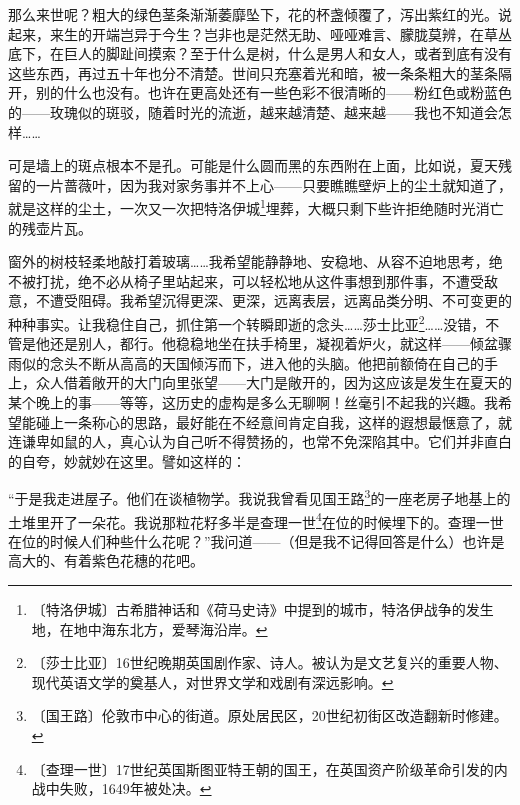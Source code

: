 \documentclass[12pt,UTF-8,openany]{ctexbook}
\begin{document}
\begin{normalsize}
    那么来世呢？粗大的绿色茎条渐渐萎靡坠下，花的杯盏倾覆了，泻出紫红的光。说起来，来生的开端岂异于今生？岂非也是茫然无助、哑哑难言、朦胧莫辨，在草丛底下，在巨人的脚趾间摸索？至于什么是树，什么是男人和女人，或者到底有没有这些东西，再过五十年也分不清楚。世间只充塞着光和暗，被一条条粗大的茎条隔开，别的什么也没有。也许在更高处还有一些色彩不很清晰的——粉红色或粉蓝色的——玫瑰似的斑驳，随着时光的流逝，越来越清楚、越来越——我也不知道会怎样……
    
    可是墙上的斑点根本不是孔。可能是什么圆而黑的东西附在上面，比如说，夏天残留的一片蔷薇叶，因为我对家务事并不上心——只要瞧瞧壁炉上的尘土就知道了，就是这样的尘土，一次又一次把特洛伊城\footnote{〔特洛伊城〕古希腊神话和《荷马史诗》中提到的城市，特洛伊战争的发生地，在地中海东北方，爱琴海沿岸。}埋葬，大概只剩下些许拒绝随时光消亡的残壶片瓦。
    
    窗外的树枝轻柔地敲打着玻璃……我希望能静静地、安稳地、从容不迫地思考，绝不被打扰，绝不必从椅子里站起来，可以轻松地从这件事想到那件事，不遭受敌意，不遭受阻碍。我希望沉得更深、更深，远离表层，远离品类分明、不可变更的种种事实。让我稳住自己，抓住第一个转瞬即逝的念头……莎士比亚\footnote{〔莎士比亚〕16世纪晚期英国剧作家、诗人。被认为是文艺复兴的重要人物、现代英语文学的奠基人，对世界文学和戏剧有深远影响。}……没错，不管是他还是别人，都行。他稳稳地坐在扶手椅里，凝视着炉火，就这样——倾盆骤雨似的念头不断从高高的天国倾泻而下，进入他的头脑。他把前额倚在自己的手上，众人借着敞开的大门向里张望——大门是敞开的，因为这应该是发生在夏天的某个晚上的事——等等，这历史的虚构是多么无聊啊！丝毫引不起我的兴趣。我希望能碰上一条称心的思路，最好能在不经意间肯定自我，这样的遐想最惬意了，就连谦卑如鼠的人，真心认为自己听不得赞扬的，也常不免深陷其中。它们并非直白的自夸，妙就妙在这里。譬如这样的：
    
    “于是我走进屋子。他们在谈植物学。我说我曾看见国王路\footnote{〔国王路〕伦敦市中心的街道。原处居民区，20世纪初街区改造翻新时修建。}的一座老房子地基上的土堆里开了一朵花。我说那粒花籽多半是查理一世\footnote{〔查理一世〕17世纪英国斯图亚特王朝的国王，在英国资产阶级革命引发的内战中失败，1649年被处决。}在位的时候埋下的。查理一世在位的时候人们种些什么花呢？”我问道——（但是我不记得回答是什么）也许是高大的、有着紫色花穗的花吧。
    

\end{normalsize}
\end{document}
